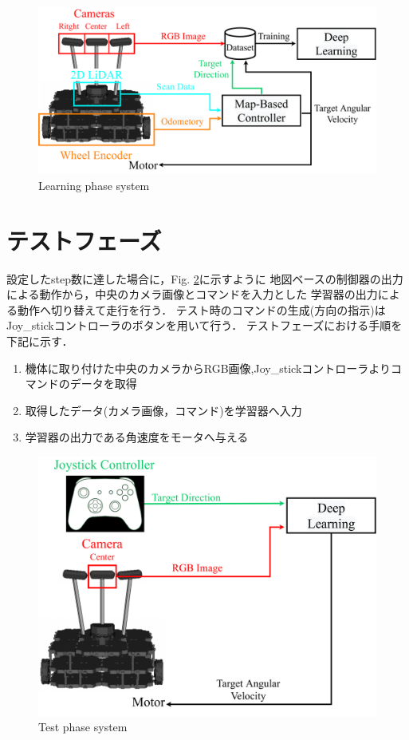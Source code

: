 \begin{figure}[H]
    \centering
    \includegraphics[width = 12cm]{./figs/system_learning.pdf}
    \caption{Learning phase system }
    \label{fig::learningsystem}
\end{figure}


\newpage
\section{テストフェーズ}
\label{test}
設定したstep数に達した場合に，Fig. \ref{fig::testsystem}に示すように
地図ベースの制御器の出力による動作から，中央のカメラ画像とコマンドを入力とした
学習器の出力による動作へ切り替えて走行を行う．
テスト時のコマンドの生成(方向の指示)はJoy\_stickコントローラのボタンを用いて行う．
テストフェーズにおける手順を下記に示す．
\begin{enumerate}
    \item 機体に取り付けた中央のカメラからRGB画像,Joy\_stickコントローラよりコマンドのデータを取得
    \item 取得したデータ(カメラ画像，コマンド)を学習器へ入力
    \item 学習器の出力である角速度をモータへ与える
  \end{enumerate}


\begin{figure}[h]
    \centering
    \includegraphics[width = 12cm]{./figs/system_test.pdf}
    \caption{Test phase system}
    \label{fig::testsystem}
\end{figure}

